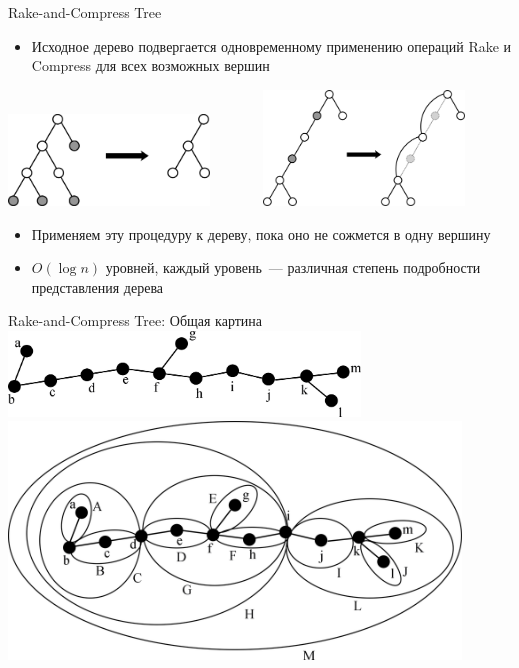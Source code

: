 \documentclass[hyperref=unicode,graphics=pdflatex,13pt]{beamer}
\begin{document}
\begin{frame}[shrink]{Rake-and-Compress Tree}
\begin{itemize}
    \item Исходное дерево подвергается одновременному применению операций Rake и Compress для всех 
          возможных вершин
\end{itemize}
\centering
\includegraphics[width=0.4\textwidth]{picture/rake.png}~~~~~~~
\includegraphics[width=0.4\textwidth]{picture/compress.png}
\begin{itemize}
    \item Применяем эту процедуру к дереву, пока оно не сожмется в одну вершину
    \item $O(\log n)$ уровней, каждый уровень~--- различная степень подробности представления 
          дерева
\end{itemize}
\end{frame}

\begin{frame}[shrink]{Rake-and-Compress Tree: Общая картина}
\centering
\includegraphics[width=0.7\textwidth]{picture/rc_tree_1_primitive_tree.png}\\
\includegraphics[width=0.9\textwidth]{picture/rc_tree_2_completed_clustering.png}
\end{frame}
\end{document}
